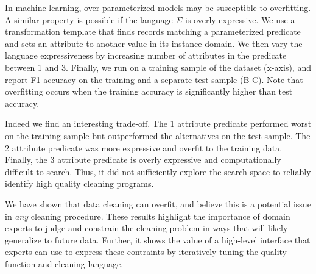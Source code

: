  In machine learning, over-parameterized models may be susceptible to overfitting.  A similar property is possible if the language $\Sigma$ is overly expressive.  We use a transformation template that finds records matching a parameterized predicate and sets an attribute to another value in its instance domain.   We then vary the language expressiveness by increasing number of attributes in the predicate between 1 and 3.  Finally, we run \sys on a training sample of the dataset (x-axis), and report F1 accuracy on the training and a separate test sample (B-C).  Note that overfitting occurs when the training accuracy is significantly higher than test accuracy.

Indeed we find an interesting trade-off.  The 1 attribute predicate performed worst on the training sample but outperformed the alternatives on the test sample.  The 2 attribute predicate was more expressive and overfit to the training data.  Finally, the 3 attribute predicate is overly expressive and computationally difficult to search.  Thus, it did not sufficiently explore the search space to reliably identify high quality cleaning programs. 

 We have shown that data cleaning can overfit, and believe this is a potential issue in {\it any} cleaning procedure. These results highlight the importance of domain experts to judge and constrain the cleaning problem in ways that will likely generalize to future data. Further, it shows the value of a high-level interface that experts can use to express these contraints by iteratively tuning the quality function and cleaning language. 



